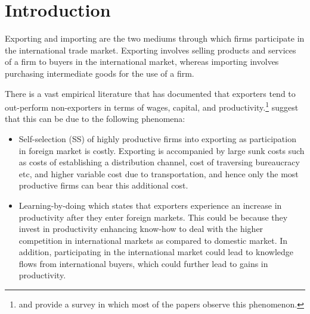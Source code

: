 \documentclass[12pt]{article}
\begin{document}
%

\newpage


\small

\tableofcontents

\newpage
{}
\section{Introduction}\label{sec:introduction}

Exporting and importing are the two mediums through which firms
participate in the international trade market. Exporting involves
selling products and services of a firm to buyers in the international
market, whereas importing involves purchasing intermediate goods for
the use of a firm.  


There is a vast empirical literature  that has documented that exporters tend to
out-perform non-exporters  in terms of wages, capital, and
productivity.\footnote{\textcite{wagner2007exports} and
  \textcite{bernard2007firms} provide a  survey in which most of the
  papers observe this phenomenon.} \textcite{bernard1999exceptional}  suggest that this can be due
to the following phenomena:
\begin{itemize}
\item Self-selection (SS) of highly productive firms into exporting as  
participation in foreign market is costly. Exporting is accompanied by large
sunk costs
such as costs of establishing a distribution channel,
cost of traversing bureaucracy etc, and higher variable cost due to 
transportation, and hence only the most productive firms can bear this
additional cost. 
\item Learning-by-doing which states that exporters experience an
  increase in productivity after they enter foreign markets. This
  could be because  they invest in productivity enhancing know-how
 to deal with the higher competition in international markets as compared to
domestic market. In addition, participating in the
international market could lead to knowledge flows from international
buyers, which could further lead to gains in productivity.
\end{itemize}
\end{document}
